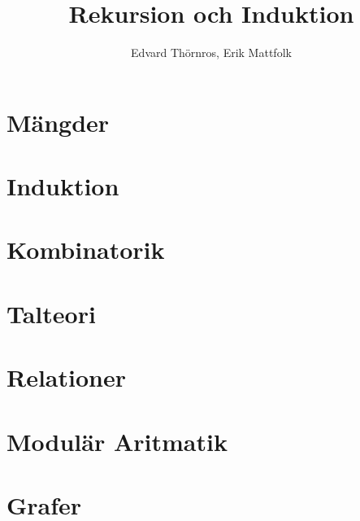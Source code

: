 \documentclass{article}
\title{Rekursion och Induktion}
\author{Edvard Thörnros, Erik Mattfolk}
\begin{document}
	\maketitle
	\newpage

	\section{Mängder}

	\section{Induktion}

	\section{Kombinatorik}

	\section{Talteori}

	\section{Relationer}

	\section{Modulär Aritmatik}

	\section{Grafer}
\end{document}
